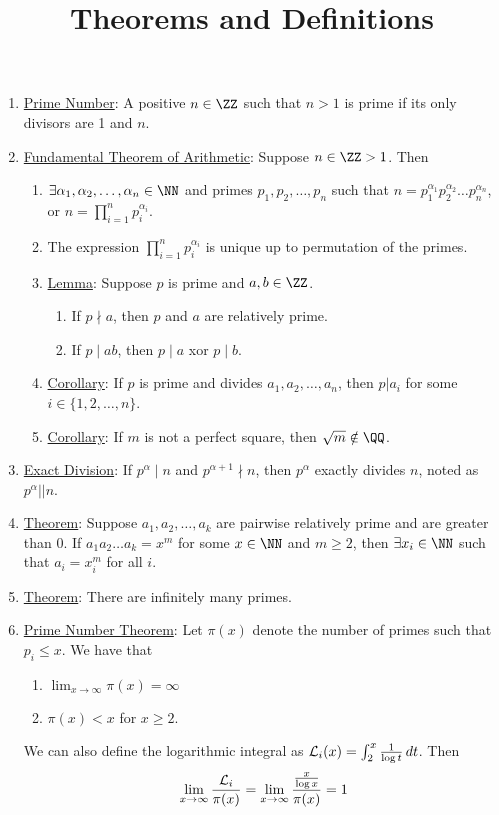 \documentclass{hw}
\title{Theorems and Definitions}
\date{}
\author{}
\newcommand{\Define}[1]{\item\underline{#1}:}
\newcommand{\prm}{p}
\begin{document}
\maketitle

\begin{enumerate}
\Define{Prime Number} A positive $n\in\ZZ$ such that $n>1$ is prime if its only
divisors are 1 and $n$.

\Define{Fundamental Theorem of Arithmetic} Suppose $n\in\ZZ > 1$. Then
\begin{enumerate}
\item $\exists\alpha_{1},\alpha_{2},\dots,\alpha_{n}\in\NN$ and primes $\prm_{1},
\prm_{2},\dots,\prm_{n}$ such that $n=\prm_{1}^{\alpha_{1}}\prm_{2}^{\alpha_{2}}
\dots\prm_{n}^{\alpha_{n}}$, or $n=\prod_{i=1}^{n}\prm_{i}^{\alpha_{i}}$.
\item The expression $\prod_{i=1}^{n}\prm_{i}^{\alpha_{i}}$ is unique up to
permutation of the primes.

\Define{Lemma} Suppose $\prm$ is prime and $a,b\in\ZZ$.
\begin{enumerate}
\item If $\prm\nmid a$, then $\prm$ and $a$ are relatively prime.
\item If $\prm\mid ab$, then $\prm\mid a$ xor $\prm\mid b$.
\end{enumerate}

\Define{Corollary} If $\prm$ is prime and divides $a_{1},a_{2},\dots,a_{n}$, then
$p|a_{i}$ for some $i\in\{ 1,2,\dots,n \}$.

\Define{Corollary} If $m$ is not a perfect square, then $\sqrt{m}\notin\QQ$.
\end{enumerate}

\Define{Exact Division} If $\prm^{\alpha}\mid n$ and $\prm^{\alpha+1}\nmid n$, then
$\prm^{\alpha}$ exactly divides $n$, noted as $\prm^{\alpha}||n$.

\Define{Theorem} Suppose $a_{1},a_{2},\dots,a_{k}$ are pairwise relatively prime
and are greater than 0. If $a_{1}a_{2}\dots a_{k} = x^{m}$ for some $x\in\NN$ and
$m\geq2$, then $\exists x_{i}\in\NN$ such that $a_{i} = x_{i}^{m}$ for all $i$.

\Define{Theorem} There are infinitely many primes.

\Define{Prime Number Theorem} Let $\pi(x)$ denote the number of primes such that
$\prm_{i}\leq x$. We have that
\begin{enumerate}
\item $\lim_{x\to\infty}\pi(x)=\infty$
\item $\pi(x) < x$ for $x\geq2$.
\end{enumerate}
We can also define the logarithmic integral as
$\mathcal{L}_{i}(x)=\int_{2}^{x}{1\over\log{t}}\mathop{dt}$. Then
\[
\lim_{x\to\infty}{\mathcal{L}_{i}\over\pi(x)}=
\lim_{x\to\infty}{{x\over\log{x}}\over\pi(x)} = 1
\]
\end{enumerate}
\end{document}
